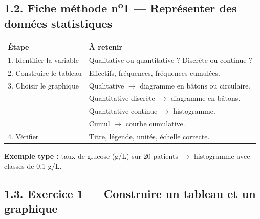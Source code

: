 \documentclass[11pt,a4paper]{article}
\begin{document}
\subsection*{1.2. Fiche méthode n\textsuperscript{o}1 — Représenter des données statistiques}

\begin{rappel}
\begin{tabularx}{\linewidth}{|p{3.5cm}|X|}
\hline
\textbf{Étape} & \textbf{À retenir} \\
\hline
1. Identifier la variable & Qualitative ou quantitative ? Discrète ou continue ? \\
\hline
2. Construire le tableau & Effectifs, fréquences, fréquences cumulées. \\
\hline
3. Choisir le graphique & Qualitative $\rightarrow$ diagramme en bâtons ou circulaire. \\
 & Quantitative discrète $\rightarrow$ diagramme en bâtons. \\
 & Quantitative continue $\rightarrow$ histogramme. \\
 & Cumul $\rightarrow$ courbe cumulative. \\
\hline
4. Vérifier & Titre, légende, unités, échelle correcte. \\
\hline
\end{tabularx}

\vspace{0.2cm}
\textbf{Exemple type :} taux de glucose (g/L) sur 20 patients $\rightarrow$ histogramme avec classes de 0,1 g/L.
\end{rappel}

\subsection*{1.3. Exercice 1 — Construire un tableau et un graphique}
\end{document}
